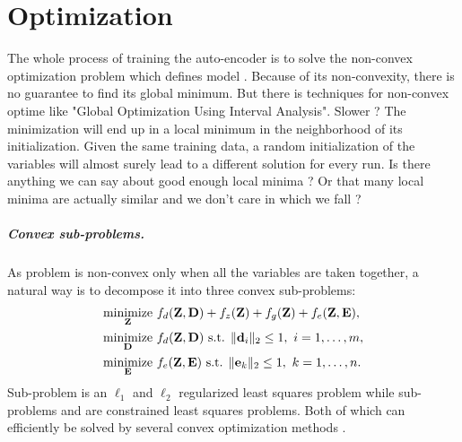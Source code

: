 

\chapter{Optimization} \label{chap:optimization}


The whole process of training the auto-encoder is to solve the non-convex optimization problem which defines model . Because of its non-convexity, there is no guarantee to find its global minimum.
{\color{red} But there is techniques for non-convex optime like "Global Optimization Using Interval Analysis". Slower ?}
The minimization will end up in a local minimum in the neighborhood of its initialization. Given the same training data, a random initialization of the variables will almost surely lead to a different solution for every run.
{\color{red} Is there anything we can say about good enough local minima ? Or that many local minima are actually similar and we don't care in which we fall ?}

\paragraph{Convex sub-problems.}
As problem  is non-convex only when all the variables are taken together, a natural way is to decompose it into three convex sub-problems:
\begin{align}
	\label{eqn:minZ}
	\operatorname*{minimize}\limits_{\mathbf{Z}} \  & f_d(\mathbf{Z}, \mathbf{D}) + f_z(\mathbf{Z}) + f_g(\mathbf{Z}) + f_e(\mathbf{Z}, \mathbf{E}) , \\
	\label{eqn:minD}
	\operatorname*{minimize}\limits_{\mathbf{D}} \  & f_d(\mathbf{Z}, \mathbf{D}) \text{ s.t. } \|\mathbf{d}_i\|_2 \leq 1 ,\ i = 1, \ldots, m , \\
	\label{eqn:minE}
	\operatorname*{minimize}\limits_{\mathbf{E}} \  & f_e(\mathbf{Z}, \mathbf{E}) \text{ s.t. } \|\mathbf{e}_k\|_2 \leq 1 ,\ k = 1, \ldots, n.
\end{align}
Sub-problem  is an $\ell_1$ and $\ell_2$ regularized least squares problem while sub-problems  and  are constrained least squares problems. Both of which can efficiently be solved by several convex optimization methods \cite{combettes2011proximalSplitting, beck2009FISTA, chambolle2011PrimalDual}.

